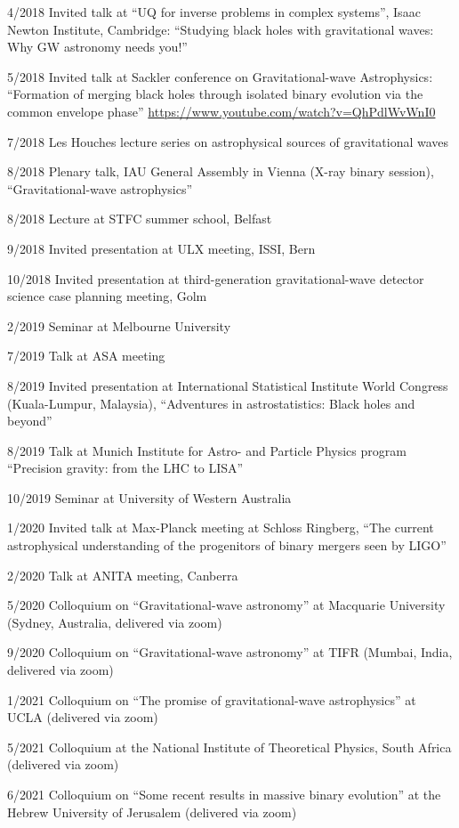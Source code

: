 \documentclass[margin,line]{res}
\begin{document}
\begin{resume}
4/2018	Invited talk at ``UQ for inverse problems in complex systems'', Isaac Newton Institute, Cambridge: ``Studying black holes with gravitational waves: Why GW astronomy needs you!''

5/2018 Invited talk at Sackler conference on Gravitational-wave Astrophysics: ``Formation of merging black holes through isolated binary evolution via the common envelope phase'' \url{https://www.youtube.com/watch?v=QhPdlWvWnI0}

7/2018 Les Houches lecture series on astrophysical sources of gravitational waves

8/2018 Plenary talk, IAU General Assembly in Vienna (X-ray binary session), ``Gravitational-wave astrophysics''

8/2018 Lecture at STFC summer school, Belfast

9/2018 Invited presentation at ULX meeting, ISSI, Bern

10/2018 Invited presentation at third-generation gravitational-wave detector science case planning meeting, Golm

2/2019 Seminar at Melbourne University

7/2019 Talk at ASA meeting

8/2019 Invited presentation at International Statistical Institute World Congress (Kuala-Lumpur, Malaysia), ``Adventures in astrostatistics: Black holes and beyond''

8/2019 Talk at Munich Institute for Astro- and Particle Physics program ``Precision gravity: from the LHC to LISA''

10/2019 Seminar at University of Western Australia

1/2020 Invited talk at Max-Planck meeting at Schloss Ringberg, ``The current astrophysical understanding of the progenitors of binary mergers seen by LIGO''

2/2020 Talk at ANITA meeting, Canberra

5/2020 Colloquium on ``Gravitational-wave astronomy'' at Macquarie University (Sydney, Australia, delivered via zoom)

9/2020 Colloquium on  ``Gravitational-wave astronomy'' at TIFR (Mumbai, India, delivered via zoom)

1/2021 Colloquium on ``The promise of gravitational-wave astrophysics'' at UCLA (delivered via zoom)

5/2021 Colloquium at the National Institute of Theoretical Physics, South Africa (delivered via zoom)

6/2021 Colloquium on ``Some recent results in massive binary evolution''  at the Hebrew University of Jerusalem (delivered via zoom)


\end{resume}
\end{document}

